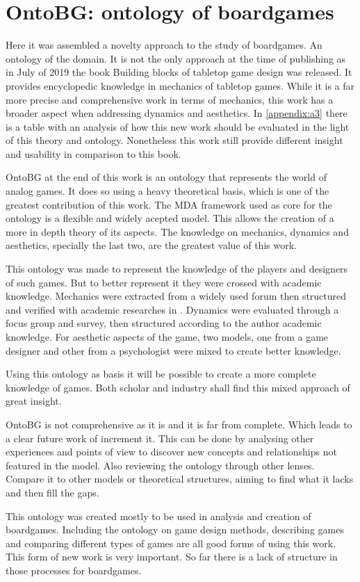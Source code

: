 \section{OntoBG: ontology of boardgames}

Here it was assembled a novelty approach to the study of boardgames. An ontology of the domain. It is not the only approach at the time of publishing as in July of 2019 the book Building blocks of tabletop game design \cite{engelstein2019building} was released. It provides encyclopedic knowledge in mechanics of tabletop games. While it is a far more precise and comprehensive work in terms of mechanics, this work has a broader aspect when addressing dynamics and aesthetics. In \autoref{appendix:a3} there is a table with an analysis of how this new work should be evaluated in the light of this theory and ontology. Nonetheless this work still provide different insight and usability in comparison to this book.

OntoBG at the end of this work is an ontology that represents the world of analog games. It does so using a heavy theoretical basis, which is one of the greatest contribution of this work. The MDA framework used as core for the ontology is a flexible and widely acepted model. This allows the creation of a more in depth theory of its aspects. The knowledge on mechanics, dynamics and aesthetics, specially the last two, are the greatest value of this work. 

This ontology was made to represent the knowledge of the players and designers of such games. But to better represent it they were crossed with academic knowledge. Mechanics were extracted from a widely used forum then structured and verified with academic researches in \cite{kritz_buildingOntology}. Dynamics were evaluated through a focus group and survey, then structured according to the author academic knowledge. For aesthetic aspects of the game, two models, one from a game designer and other from a psychologist were mixed to create better knowledge.

Using this ontology as basis it will be possible to create a more complete knowledge of games. Both scholar and industry shall find this mixed approach of great insight.

OntoBG is not comprehensive as it is and it is far from complete. Which leads to a clear future work of increment it. This can be done by analysing other experiences and points of view to discover new concepts and relationships not featured in the model. Also reviewing the ontology through other lenses. Compare it to other models or theoretical structures, aiming to find what it lacks and then fill the gaps.

This ontology was created mostly to be used in analysis and creation of boardgames. Including the ontology on game design methods, describing games and comparing different types of games are all good forms of using this work. This form of new work is very important. So far there is a lack of structure in those processes for boardgames.

